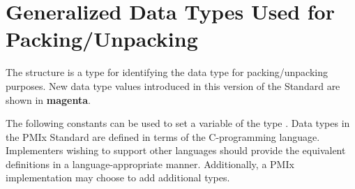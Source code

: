 \section{Generalized Data Types Used for Packing/Unpacking}

The  structure is a  type for identifying the data type for packing/unpacking purposes. New data type values introduced in this version of the Standard are shown in \textbf{\color{magenta}magenta}.

\adviceimplstart
The following constants can be used to set a variable of the type . Data types in the \ac{PMIx} Standard are defined in terms of the C-programming language. Implementers wishing to support other languages should provide the equivalent definitions in a language-appropriate manner. Additionally, a PMIx implementation may choose to add additional types.
\adviceimplend

